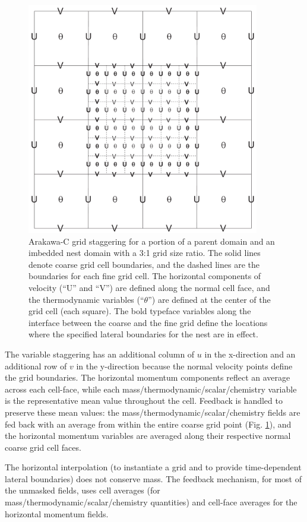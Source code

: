 %
%
\begin{figure}
  \centering
  \includegraphics[width=4in]{figures/cg_fg.pdf}
  \caption{\label{figure:cg_fg}
Arakawa-C grid staggering for a portion of a parent domain and an
imbedded nest domain with a 3:1 grid size ratio.  The solid lines
denote coarse grid cell boundaries, and the dashed lines are the
boundaries for each fine grid cell.  The horizontal components of
velocity (``U'' and ``V'') are defined along the normal cell face, and
the thermodynamic variables (``$\theta$'') are defined at the center of
the grid cell (each square).  The bold typeface variables along the
interface between the coarse and the fine grid define the locations
where the specified lateral boundaries for the nest are in
effect.  } \end{figure}

The variable staggering has an additional column 
of $u$ in the x-direction and an additional row of $v$ in the y-direction
because the normal velocity points define the grid boundaries.
The horizontal momentum components reflect an average across each 
cell-face, while each mass/thermodynamic/scalar/chemistry variable
is the representative mean value throughout the cell.  
Feedback is handled to preserve these mean values: the mass/thermodynamic/scalar/chemistry
fields are fed back with an average from within the entire 
coarse grid point (Fig. \ref{figure:cg_fg}), and the horizontal momentum variables are
averaged along their respective normal coarse grid cell faces.

The horizontal interpolation (to instantiate a grid and to provide 
time-dependent lateral boundaries) does not conserve mass.  The 
feedback mechanism, for most of the unmasked fields, uses cell 
averages (for mass/thermodynamic/scalar/chemistry quantities) and cell-face 
averages for the horizontal momentum fields.


